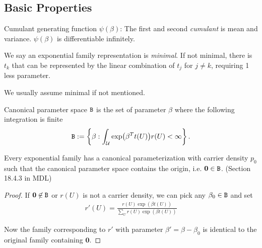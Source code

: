 \subsection{Basic Properties}

Cumulant generating function $\psi(\beta)$: The first and second \emph{cumulant} is mean and variance.
$\psi(\beta)$ is differentiable infinitely.

\begin{define}[Minimal]
	We say an exponential family representation is \emph{minimal}.
	If not minimal, there is $t_{k}$ that can be represented
	by the linear combination of $t_{j}$ for $j\not=k$, requiring 1 less parameter.
\end{define}

We usually assume minimal if not mentioned.

\begin{define}
	Canonical parameter space $\mathtt{B}$ is the set of parameter $\beta$
	where the following integration is finite
	\begin{align*}
		\Bt := \left\{\beta: \int_{\Uc} \exp(\beta^T t(U)) r(U) <\infty \right\}.
	\end{align*}

\end{define}

\begin{remark}
	Every exponential family has a canonical parameterization with carrier density $p_0$
	such that the canonical parameter space contains the origin, i.e. $\bm{0} \in \mathtt{B}$.
	(Section 18.4.3 in MDL)
\end{remark}

\begin{proof}
	If $\bm{0} \not\in \mathtt{B}$ or $r(U)$ is not a carrier density, we can pick any $\beta_0 \in \mathtt{B}$
	and set
	\begin{align*}
		r'(U) = \frac{r(U)\exp(\beta t(U))}{\sum_U r(U)\exp(\beta t(U))}
	\end{align*}
	
	Now the family corresponding to $r'$ with parameter $\beta'=\beta-\beta_0$ is identical
	to the original family containing $\bm{0}$.
\end{proof}

